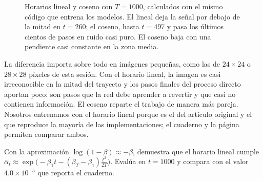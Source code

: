 \documentclass[11pt,letterpaper,oneside]{report}
\newcommand{\ab}{\bar{\alpha}}
\begin{document}
\begin{figure}[H]
\centering
{}\hfill
{}
\caption{Horarios lineal y coseno con $T=1000$, calculados con el mismo código que entrena los modelos. El lineal deja la señal por debajo de la mitad en $t=260$; el coseno, hasta $t=497$ y pasa los últimos cientos de pasos en ruido casi puro. El coseno baja con una pendiente casi constante en la zona media.}
\label{fig:horarios}
\end{figure}

La diferencia importa sobre todo en imágenes pequeñas, como las de $24\times24$ o $28\times28$ píxeles de esta sesión. Con el horario lineal, la imagen es casi irreconocible en la mitad del trayecto y los pasos finales del proceso directo aportan poco: son pasos que la red debe aprender a revertir y que casi no contienen información. El coseno reparte el trabajo de manera más pareja. Nosotros entrenamos con el horario lineal porque es el del artículo original y el que reproduce la mayoría de las implementaciones; el cuaderno y la página permiten comparar ambos.

\begin{ejercicio}
Con la aproximación $\log(1-\beta)\approx-\beta$, demuestra que el horario lineal cumple $\ab_t\approx\exp\!\big(-\beta_1t-(\beta_T-\beta_1)\tfrac{t^2}{2T}\big)$. Evalúa en $t=1000$ y compara con el valor $4.0\times10^{-5}$ que reporta el cuaderno.
\end{ejercicio}
\end{document}
